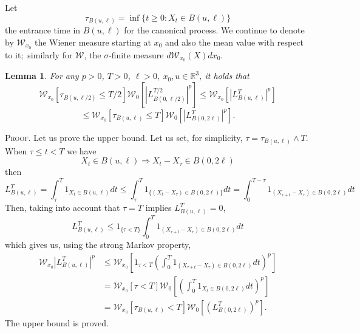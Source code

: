 \documentclass[a4paper,12pt]{article}
\newtheorem{lemma}{Lemma}
\begin{document}
Let
\[
\tau_{B(u,\ell)}=\inf\{t\geq0:X_{t}\in B(u,\ell)\}
\]
the entrance time in $B(u,\ell)$ for the canonical process. We continue to
denote by $\mathcal{W}_{x_{0}}$ the Wiener measure starting at $x_{0}$ and
also the mean value with respect to it;\ similarly for $\mathcal{W}$, the
$\sigma$-finite measure $d\mathcal{W}_{x_{0}}(X)dx_{0}$.

\begin{lemma}
For any $p>0$, $T>0$, $\ell>0$, $x_{0},u\in\mathbb{R}^{3}$, it holds that
\[
\mathcal{W}_{x_{0}}[\tau_{B(u,\ell/2)}\leq T/2]\mathcal{W}_{0}[|L_{B(0,\ell
/2)}^{T/2}|^{p}]\leq\mathcal{W}_{x_{0}}[|L_{B(u,\ell)}^{T}|^{p}]
\]%
\begin{equation}
\leq\mathcal{W}_{x_{0}}[\tau_{B(u,\ell)}\leq T]\mathcal{W}_{0}[|L_{B(0,2\ell
)}^{T}|^{p}]. \label{eq:Lmoments-bound}%
\end{equation}
\end{lemma}

\textsc{Proof.}\hspace{0.3cm} Let us prove the upper bound. Let us set, for
simplicity, $\tau=\tau_{B(u,\ell)}\wedge T$. When $\tau\leq t<T$ we have
\[
X_{t}\in B(u,\ell)\Rightarrow X_{t}-X_{\tau}\in B(0,2\ell)
\]
then
\[
L_{B(u,\ell)}^{T}=\int_{\tau}^{T}1_{X_{t}\in B(u,\ell)}dt\leq\int_{\tau}%
^{T}1_{\{(X_{t}-X_{\tau})\in B(0,2\ell)\}}dt=\int_{0}^{T-\tau}1_{(X_{\tau
+t}-X_{\tau})\in B(0,2\ell)}dt
\]
Then, taking into account that $\tau=T$ implies $L_{B(u,\ell)}^{T}=0$,
\[
L_{B(u,\ell)}^{T}\leq1_{\{\tau<T\}}\int_{0}^{T}1_{(X_{\tau+t}-X_{\tau})\in
B(0,2\ell)}dt
\]
which gives us, using the strong Markov property,
\[%
\begin{split}
\mathcal{W}_{x_{0}}|L_{B(u,\ell)}^{T}|^{p}  &  \leq\mathcal{W}_{x_{0}}\left[
1_{\tau<T}\left(  \int_{0}^{T}1_{(X_{\tau+t}-X_{\tau})\in B(0,2\ell
)}dt\right)  ^{p}\right] \\
&  =\mathcal{W}_{x_{0}}[\tau<T]\mathcal{W}_{0}\left[  \left(  \int_{0}%
^{T}1_{X_{t}\in B(0,2\ell)}dt\right)  ^{p}\right] \\
&  =\mathcal{W}_{x_{0}}[\tau_{B(u,\ell)}<T]\mathcal{W}_{0}\left[
(L_{B(0,2\ell)}^{T})^{p}\right]  .
\end{split}
\]
The upper bound is proved.
\end{document}
